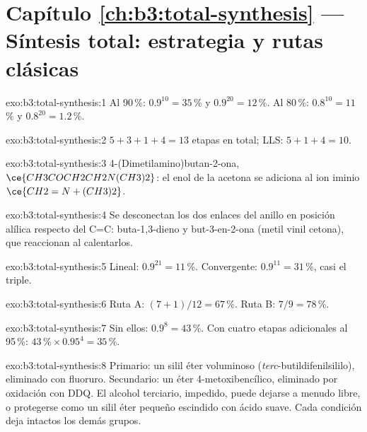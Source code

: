 \section*{Capítulo \ref{ch:b3:total-synthesis} --- Síntesis total: estrategia y rutas clásicas}

\begin{solution}{exo:b3:total-synthesis:1}
Al 90\,\%: $0.9^{10} = 35$\,\% y $0.9^{20} = 12$\,\%. Al 80\,\%: $0.8^{10} = 11$\,\% y $0.8^{20} = 1.2$\,\%.
\end{solution}

\begin{solution}{exo:b3:total-synthesis:2}
$5 + 3 + 1 + 4 = 13$ etapas en total; LLS: $5 + 1 + 4 = 10$.
\end{solution}

\begin{solution}{exo:b3:total-synthesis:3}
4-(Dimetilamino)butan-2-ona, $\ce{CH3COCH2CH2N(CH3)2}$: el enol de la acetona se adiciona al ion
iminio $\ce{CH2=N+(CH3)2}$.
\end{solution}

\begin{solution}{exo:b3:total-synthesis:4}
Se desconectan los dos enlaces del anillo en posición alílica respecto del C=C: buta-1,3-dieno y but-3-en-2-ona
(metil vinil cetona), que reaccionan al calentarlos.
\end{solution}

\begin{solution}{exo:b3:total-synthesis:5}
Lineal: $0.9^{21} = 11$\,\%. Convergente: $0.9^{11} = 31$\,\%, casi el triple.
\end{solution}

\begin{solution}{exo:b3:total-synthesis:6}
Ruta A: $(7 + 1)/12 = 67$\,\%. Ruta B: $7/9 = 78$\,\%.
\end{solution}

\begin{solution}{exo:b3:total-synthesis:7}
Sin ellos: $0.9^8 = 43$\,\%. Con cuatro etapas adicionales al 95\,\%: $43\,\% \times 0.95^4 = 35$\,\%.
\end{solution}

\begin{solution}{exo:b3:total-synthesis:8}
Primario: un silil éter voluminoso (\textit{terc}-butildifenilsililo), eliminado con fluoruro.
Secundario: un éter 4-metoxibencílico, eliminado por oxidación con DDQ. El alcohol
terciario, impedido, puede dejarse a menudo libre, o protegerse como un silil éter pequeño
escindido con ácido suave. Cada condición deja intactos los demás grupos.
\end{solution}

